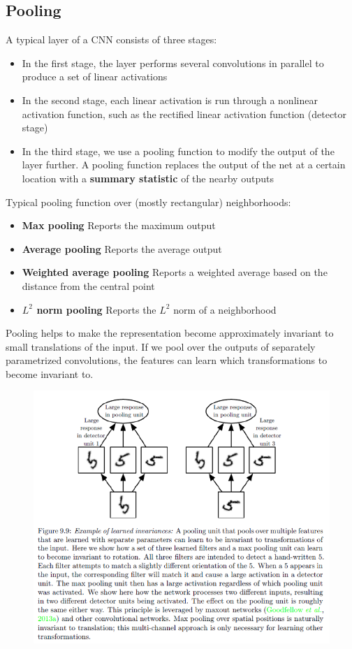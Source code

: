 \begin{multicols}{2}
	\subsection{Pooling}
	A typical layer of a CNN consists of three stages:
	\begin{itemize}
		\item In the first stage, the layer performs several convolutions in parallel to produce a set of linear activations
		\item In the second stage, each linear activation is run through a nonlinear activation function, such as the rectified linear activation function (detector stage)
		\item In the third stage, we use a pooling function to modify the output of the layer further. A pooling function replaces the output of the net at a certain location with a \textbf{summary statistic} of the nearby outputs
	\end{itemize}
	Typical pooling function over (mostly rectangular) neighborhoods:
	\begin{itemize}
		\item \textbf{Max pooling} Reports the maximum output
		\item\textbf{Average pooling} Reports the average output	
		\item\textbf{Weighted average pooling} Reports a weighted average based on the distance from the central point
		\item\textbf{$L^2$ norm pooling} Reports the $L^2$ norm of a neighborhood
	\end{itemize}
	Pooling helps to make the representation become approximately invariant to small translations of the input.
	If we pool over the outputs of separately parametrized convolutions, the features can learn which transformations to become invariant to.
	\begin{figure}[H]
		\centering
		\includegraphics[width=0.8\linewidth]{images/pooling.png}

\end{figure}
\end{multicols}
